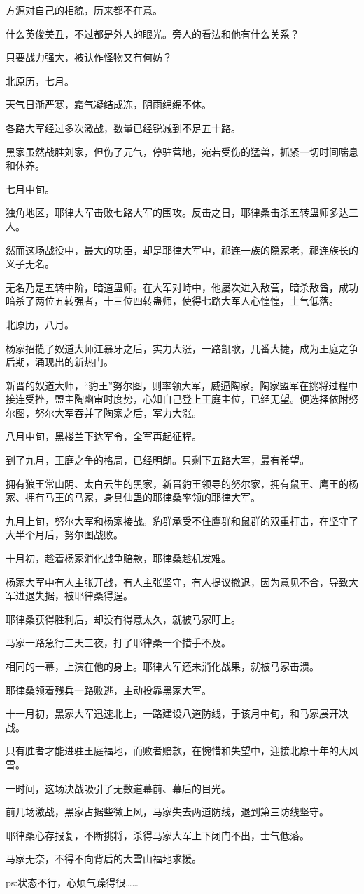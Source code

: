 \begin{this_body}
方源对自己的相貌，历来都不在意。

什么英俊美丑，不过都是外人的眼光。旁人的看法和他有什么关系？

只要战力强大，被认作怪物又有何妨？

北原历，七月。

天气日渐严寒，霜气凝结成冻，阴雨绵绵不休。

各路大军经过多次激战，数量已经锐减到不足五十路。

黑家虽然战胜刘家，但伤了元气，停驻营地，宛若受伤的猛兽，抓紧一切时间喘息和休养。

七月中旬。

独角地区，耶律大军击败七路大军的围攻。反击之日，耶律桑击杀五转蛊师多达三人。

然而这场战役中，最大的功臣，却是耶律大军中，祁连一族的隐家老，祁连族长的义子无名。

无名乃是五转中阶，暗道蛊师。在大军对峙中，他屡次进入敌营，暗杀敌酋，成功暗杀了两位五转强者，十三位四转蛊师，使得七路大军人心惶惶，士气低落。

北原历，八月。

杨家招揽了奴道大师江暴牙之后，实力大涨，一路凯歌，几番大捷，成为王庭之争后期，涌现出的新热门。

新晋的奴道大师，“豹王”努尔图，则率领大军，威逼陶家。陶家盟军在挑将过程中接连受挫，盟主陶幽审时度势，心知自己登上王庭主位，已经无望。便选择依附努尔图，努尔大军吞并了陶家之后，军力大涨。

八月中旬，黑楼兰下达军令，全军再起征程。

到了九月，王庭之争的格局，已经明朗。只剩下五路大军，最有希望。

拥有狼王常山阴、太白云生的黑家，新晋豹王领导的努尔家，拥有鼠王、鹰王的杨家、拥有马王的马家，身具仙蛊的耶律桑率领的耶律大军。

九月上旬，努尔大军和杨家接战。豹群承受不住鹰群和鼠群的双重打击，在坚守了大半个月后，努尔图战败。

十月初，趁着杨家消化战争赔款，耶律桑趁机发难。

杨家大军中有人主张开战，有人主张坚守，有人提议撤退，因为意见不合，导致大军进退失据，被耶律桑得逞。

耶律桑获得胜利后，却没有得意太久，就被马家盯上。

马家一路急行三天三夜，打了耶律桑一个措手不及。

相同的一幕，上演在他的身上。耶律大军还未消化战果，就被马家击溃。

耶律桑领着残兵一路败逃，主动投靠黑家大军。

十一月初，黑家大军迅速北上，一路建设八道防线，于该月中旬，和马家展开决战。

只有胜者才能进驻王庭福地，而败者赔款，在惋惜和失望中，迎接北原十年的大风雪。

一时间，这场决战吸引了无数道幕前、幕后的目光。

前几场激战，黑家占据些微上风，马家失去两道防线，退到第三防线坚守。

耶律桑心存报复，不断挑将，杀得马家大军上下闭门不出，士气低落。

马家无奈，不得不向背后的大雪山福地求援。

ps:状态不行，心烦气躁得很……

\end{this_body}

